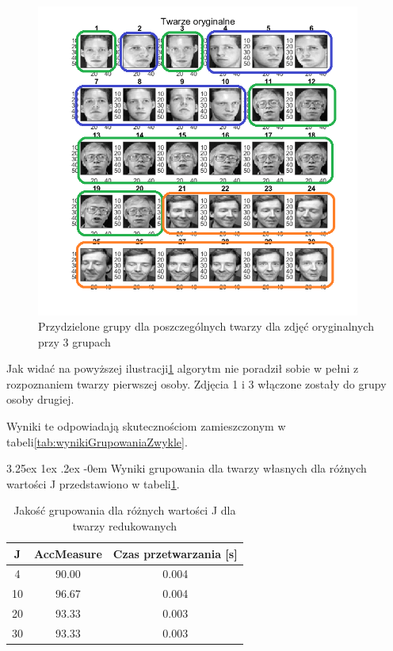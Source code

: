 \documentclass[11pt, a4paper]{article}
\makeatletter
\newcommand{\fbi}{\leavevmode{\parindent=1em\indent}}
\renewcommand\paragraph{\@startsection{paragraph}{5}{\z@}
  {3.25ex \@plus1ex \@minus.2ex}
  {-0em}
  {\normalfont\normalsize\bfseries}}
\makeatother
\begin{document}
\begin{figure}[H]
	\centering
	\includegraphics[width=0.95\textwidth]{./assets/ilustracja_zad2_dane_pogrupowane_3.png}
	\caption{Przydzielone grupy dla poszczególnych twarzy dla zdjęć oryginalnych przy 3 grupach}
	\label{fig:ilustracja_zad2_dane_pogrupowane_3}
\end{figure}

\fbi
Jak widać na powyższej ilustracji\ref{fig:ilustracja_zad2_dane_pogrupowane_3} algorytm nie poradził sobie w pełni z rozpoznaniem twarzy pierwszej osoby. Zdjęcia 1 i 3 włączone zostały do grupy osoby drugiej.

\fbi
Wyniki te odpowiadają skutecznościom zamieszczonym w tabeli\ref{tab:wynikiGrupowaniaZwykle}.

\paragraph{}
\fbi
Wyniki grupowania dla twarzy własnych dla różnych wartości J przedstawiono w tabeli\ref{tab:wynikiGrupowaniaWlasne}.

\begin{table}[H]
	\centering
	\caption{Jakość grupowania dla różnych wartości J dla twarzy redukowanych}
	\begin{tabular}{|c|c|c|}
		\hline 
		J & AccMeasure & Czas przetwarzania [s] \\ 
		\hline
		4 & 90.00 & 0.004 \\
		\hline
		10 & 96.67 & 0.004 \\
		\hline
		20 & 93.33 & 0.003 \\
		\hline
		30 & 93.33 & 0.003 \\
		\hline
	\end{tabular}
	\label{tab:wynikiGrupowaniaWlasne}
\end{table}
\end{document}
